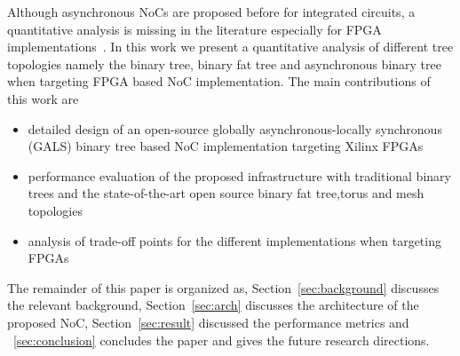 Although asynchronous NoCs are proposed before for integrated circuits, a quantitative analysis is missing in the literature especially for FPGA implementations~\cite{Bjerregaard2005, USP2011}.
In this work we present a quantitative analysis of different tree topologies namely the binary tree, binary fat tree and asynchronous binary tree when targeting FPGA based NoC implementation. 
The main contributions of this work are
\begin{itemize}
\item detailed design of an open-source globally asynchronous-locally synchronous (GALS) binary tree based NoC implementation targeting Xilinx FPGAs
\item performance evaluation of the proposed infrastructure with traditional binary trees and the state-of-the-art open source binary fat tree,torus and mesh topologies
\item analysis of trade-off points for the different implementations when targeting FPGAs
\end{itemize}
The remainder of this paper is organized as, Section~\ref{sec:background} discusses the relevant background, Section~\ref{sec:arch} discusses the architecture of the proposed NoC, Section~\ref{sec:result} discussed the performance metrics and ~\ref{sec:conclusion} concludes the paper and gives the future research directions.